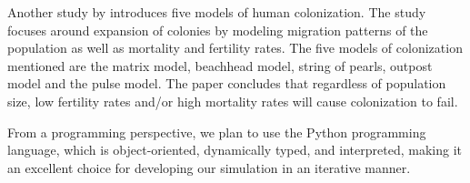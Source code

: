 \documentclass[12pt]{article}
\begin{document}
Another study by \cite{moore2001evaluating} introduces five models of human colonization.  The study focuses around expansion of colonies by modeling migration patterns of the population as well as mortality and fertility rates.  The five models of colonization mentioned are the matrix model, beachhead model, string of pearls, outpost model and the pulse model.  The paper concludes that regardless of population size, low fertility rates and/or high mortality rates will cause colonization to fail.

From a programming perspective, we plan to use the Python programming language,
which is object-oriented, dynamically typed, and interpreted, making it an
excellent choice for developing our simulation in an iterative manner.

\clearpage
{}

\end{document}
